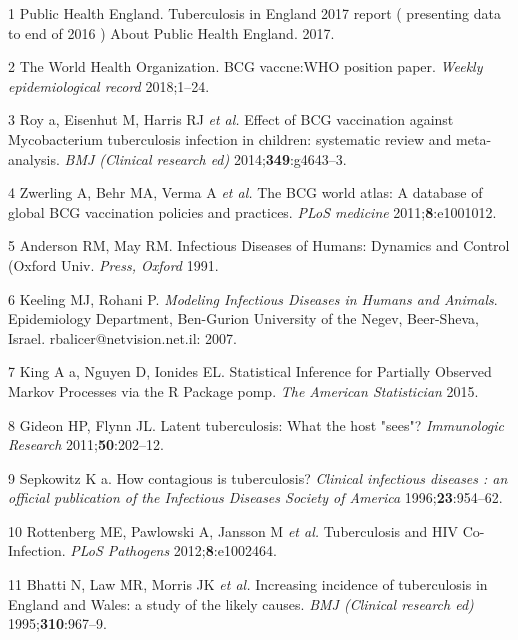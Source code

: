 \documentclass[11pt,twoside]{bristolthesis}
\begin{document}
  \hypertarget{refs}{}
  \leavevmode\hypertarget{ref-PHE2017}{}%
  1 Public Health England. Tuberculosis in England 2017 report ( presenting data to end of 2016 ) About Public Health England. 2017.
  
  \leavevmode\hypertarget{ref-TheWorldHealthOrganization:2018va}{}%
  2 The World Health Organization. BCG vaccne:WHO position paper. \emph{Weekly epidemiological record} 2018;1--24.
  
  \leavevmode\hypertarget{ref-Roy2014}{}%
  3 Roy a, Eisenhut M, Harris RJ \emph{et al.} Effect of BCG vaccination against Mycobacterium tuberculosis infection in children: systematic review and meta-analysis. \emph{BMJ (Clinical research ed)} 2014;\textbf{349}:g4643--3.
  
  \leavevmode\hypertarget{ref-Zwerling2011a}{}%
  4 Zwerling A, Behr MA, Verma A \emph{et al.} The BCG world atlas: A database of global BCG vaccination policies and practices. \emph{PLoS medicine} 2011;\textbf{8}:e1001012.
  
  \leavevmode\hypertarget{ref-Anderson1991}{}%
  5 Anderson RM, May RM. Infectious Diseases of Humans: Dynamics and Control (Oxford Univ. \emph{Press, Oxford} 1991.
  
  \leavevmode\hypertarget{ref-Keeling2007}{}%
  6 Keeling MJ, Rohani P. \emph{Modeling Infectious Diseases in Humans and Animals}. Epidemiology Department, Ben-Gurion University of the Negev, Beer-Sheva, Israel. rbalicer@netvision.net.il: 2007.
  
  \leavevmode\hypertarget{ref-King}{}%
  7 King A a, Nguyen D, Ionides EL. Statistical Inference for Partially Observed Markov Processes via the R Package pomp. \emph{The American Statistician} 2015.
  
  \leavevmode\hypertarget{ref-Gideon2011a}{}%
  8 Gideon HP, Flynn JL. Latent tuberculosis: What the host "sees"? \emph{Immunologic Research} 2011;\textbf{50}:202--12.
  
  \leavevmode\hypertarget{ref-Sepkowitz1996}{}%
  9 Sepkowitz K a. How contagious is tuberculosis? \emph{Clinical infectious diseases : an official publication of the Infectious Diseases Society of America} 1996;\textbf{23}:954--62.
  
  \leavevmode\hypertarget{ref-Rottenberg2012}{}%
  10 Rottenberg ME, Pawlowski A, Jansson M \emph{et al.} Tuberculosis and HIV Co-Infection. \emph{PLoS Pathogens} 2012;\textbf{8}:e1002464.
  
  \leavevmode\hypertarget{ref-Bhatti1995}{}%
  11 Bhatti N, Law MR, Morris JK \emph{et al.} Increasing incidence of tuberculosis in England and Wales: a study of the likely causes. \emph{BMJ (Clinical research ed)} 1995;\textbf{310}:967--9.
  
\end{document}
